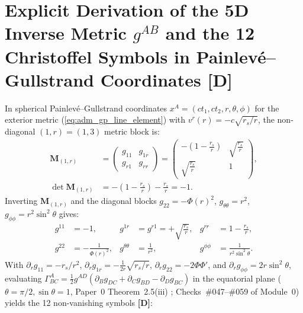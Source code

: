 \documentclass[11pt,a4paper]{article}
\newcommand{\catD}{\textbf{\textcolor{blue!75!black}{[D]}}}
\theoremstyle{definition}
\theoremstyle{remark}
\begin{document}
\section{\texorpdfstring{Explicit Derivation of the 5D Inverse Metric $g^{AB}$ and the 12 Christoffel Symbols in Painlev\'e--Gullstrand Coordinates \catD}{Explicit Derivation of the 5D Inverse Metric and the 12 Christoffel Symbols}}
\label{app:christoffel_proofs}

In spherical Painlev\'e--Gullstrand coordinates $x^A = (c t_1, c t_2, r, \theta, \phi)$ for the exterior metric (\ref{eq:adm_gp_line_element}) with $v^r(r) = -c\sqrt{r_s/r}$, the non-diagonal $(1, r) = (1, 3)$ metric block is:
\begin{align}
  \mathbf{M}_{(1,r)} &= \begin{pmatrix} g_{11} & g_{1r} \\[3pt] g_{r1} & g_{rr} \end{pmatrix} = \begin{pmatrix} -\left(1 - \frac{r_s}{r}\right) & \sqrt{\frac{r_s}{r}} \\[4pt] \sqrt{\frac{r_s}{r}} & 1 \end{pmatrix}, \nonumber \\[4pt]
  \det\mathbf{M}_{(1,r)} &= -\left(1 - \frac{r_s}{r}\right) - \frac{r_s}{r} = -1.
  \label{eq:appA_block_1r}
\end{align}
Inverting $\mathbf{M}_{(1,r)}$ and the diagonal blocks $g_{22} = -\Phi(r)^2$, $g_{\theta\theta} = r^2$, $g_{\phi\phi} = r^2\sin^2\theta$ gives:
\begin{align}
  g^{11} &= -1, & g^{1r} &= g^{r1} = +\sqrt{\frac{r_s}{r}}, & g^{rr} &= 1 - \frac{r_s}{r}, \nonumber \\[3pt]
  g^{22} &= -\frac{1}{\Phi(r)^2}, & g^{\theta\theta} &= \frac{1}{r^2}, & g^{\phi\phi} &= \frac{1}{r^2\sin^2\theta}.
  \label{eq:appA_ginv_explicit}
\end{align}
With $\partial_r g_{11} = -r_s/r^2$, $\partial_r g_{1r} = -\frac{1}{2r}\sqrt{r_s/r}$, $\partial_r g_{22} = -2\Phi\Phi'$, and $\partial_r g_{\phi\phi} = 2r\sin^2\theta$, evaluating $\Gamma^A_{BC} = \frac{1}{2}g^{AD}(\partial_B g_{DC} + \partial_C g_{BD} - \partial_D g_{BC})$ in the equatorial plane ($\theta = \pi/2, \sin\theta = 1$, Paper~0 Theorem~2.5(iii) \cite{JV_Paper0}; Checks~\#047--\#059 of Module~0) yields the 12 non-vanishing symbols \catD:
\end{document}
